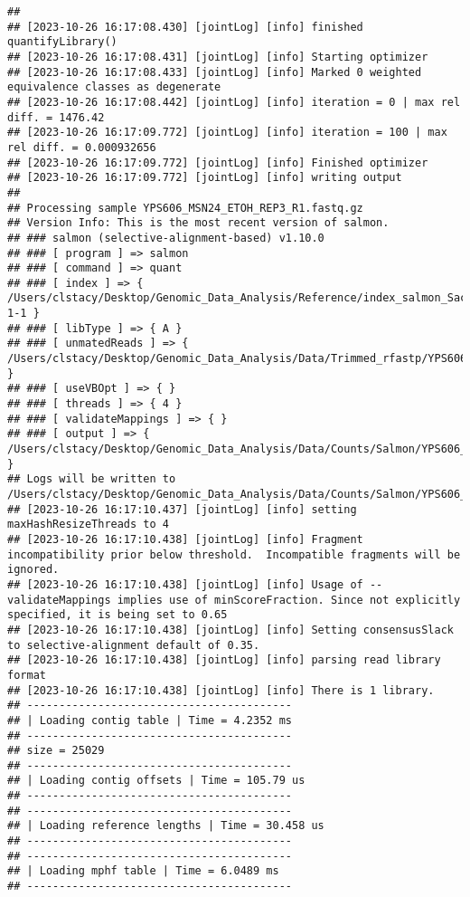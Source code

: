 \documentclass[
]{book}
\begin{document}
\begin{verbatim}
## 
## [2023-10-26 16:17:08.430] [jointLog] [info] finished quantifyLibrary()
## [2023-10-26 16:17:08.431] [jointLog] [info] Starting optimizer
## [2023-10-26 16:17:08.433] [jointLog] [info] Marked 0 weighted equivalence classes as degenerate
## [2023-10-26 16:17:08.442] [jointLog] [info] iteration = 0 | max rel diff. = 1476.42
## [2023-10-26 16:17:09.772] [jointLog] [info] iteration = 100 | max rel diff. = 0.000932656
## [2023-10-26 16:17:09.772] [jointLog] [info] Finished optimizer
## [2023-10-26 16:17:09.772] [jointLog] [info] writing output 
## 
## Processing sample YPS606_MSN24_ETOH_REP3_R1.fastq.gz
## Version Info: This is the most recent version of salmon.
## ### salmon (selective-alignment-based) v1.10.0
## ### [ program ] => salmon 
## ### [ command ] => quant 
## ### [ index ] => { /Users/clstacy/Desktop/Genomic_Data_Analysis/Reference/index_salmon_Saccharomyces_cerevisiae.R64-1-1 }
## ### [ libType ] => { A }
## ### [ unmatedReads ] => { /Users/clstacy/Desktop/Genomic_Data_Analysis/Data/Trimmed_rfastp/YPS606_MSN24_ETOH_REP3_R1.fastq.gz }
## ### [ useVBOpt ] => { }
## ### [ threads ] => { 4 }
## ### [ validateMappings ] => { }
## ### [ output ] => { /Users/clstacy/Desktop/Genomic_Data_Analysis/Data/Counts/Salmon/YPS606_MSN24_ETOH_REP3_R1.fastq.gz_quant }
## Logs will be written to /Users/clstacy/Desktop/Genomic_Data_Analysis/Data/Counts/Salmon/YPS606_MSN24_ETOH_REP3_R1.fastq.gz_quant/logs
## [2023-10-26 16:17:10.437] [jointLog] [info] setting maxHashResizeThreads to 4
## [2023-10-26 16:17:10.438] [jointLog] [info] Fragment incompatibility prior below threshold.  Incompatible fragments will be ignored.
## [2023-10-26 16:17:10.438] [jointLog] [info] Usage of --validateMappings implies use of minScoreFraction. Since not explicitly specified, it is being set to 0.65
## [2023-10-26 16:17:10.438] [jointLog] [info] Setting consensusSlack to selective-alignment default of 0.35.
## [2023-10-26 16:17:10.438] [jointLog] [info] parsing read library format
## [2023-10-26 16:17:10.438] [jointLog] [info] There is 1 library.
## -----------------------------------------
## | Loading contig table | Time = 4.2352 ms
## -----------------------------------------
## size = 25029
## -----------------------------------------
## | Loading contig offsets | Time = 105.79 us
## -----------------------------------------
## -----------------------------------------
## | Loading reference lengths | Time = 30.458 us
## -----------------------------------------
## -----------------------------------------
## | Loading mphf table | Time = 6.0489 ms
## -----------------------------------------

\end{verbatim}
\end{document}
